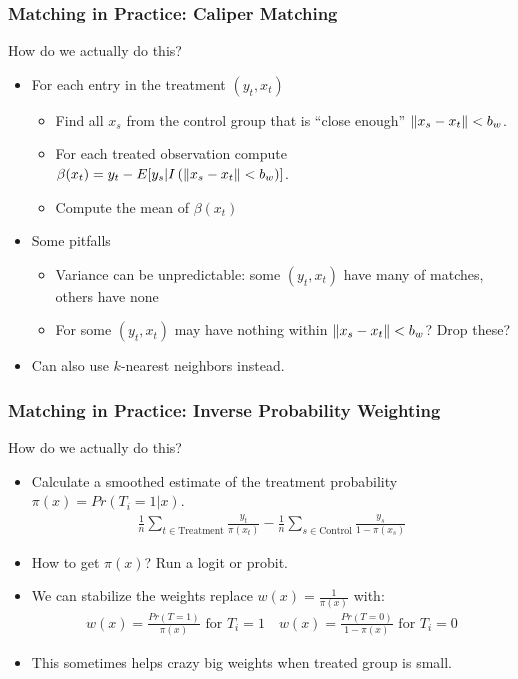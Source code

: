 \documentclass[xcolor=pdftex,dvipsnames,table,mathserif,aspectratio=169]{beamer}
\DeclarePairedDelimiter\norm{\lVert}{\rVert}%
\begin{document}
\begin{frame}
\frametitle{Matching in Practice: \alert{Caliper Matching}}
How do we actually do this?
\begin{itemize}
\item For each entry in the treatment $(y_t,x_t)$
\begin{itemize}
\item Find all $x_s$ from the control group that is ``close enough''  $\norm{x_s -x_t}<b_w$.
\item For each treated observation compute $\beta(x_t) = y_t - E[y_s |  I \left( \norm{x_s -x_t}<b_w\right)]$.
\item Compute the mean of $\beta(x_t)$
\end{itemize}
\item Some pitfalls
\begin{itemize}
\item Variance can be unpredictable: some $(y_t,x_t)$ have many of matches, others have none
\item For some $(y_t,x_t)$ may have nothing within $\norm{x_s -x_t}<b_w$? Drop these?
\end{itemize}
\item Can also use $k$-\alert{nearest neighbors} instead.
\end{itemize}
\end{frame}


\begin{frame}
\frametitle{Matching in Practice: \alert{Inverse Probability Weighting}}
How do we actually do this?
\begin{itemize}
\item Calculate a smoothed estimate of the treatment probability $\pi(x) = Pr(T_i =1 | x)$.
\begin{align*}
\frac{1}{n}\sum_{t \in \text{Treatment}} \frac{y_t}{\pi(x_t)} - \frac{1}{n} \sum_{s \in \text{Control}} \frac{y_s}{1-\pi(x_s)}
\end{align*}
\item How to get $\pi(x)$? Run a logit or probit.
\item We can stabilize the weights replace $w(x) =\frac{1}{\pi(x)}$ with:
\begin{align*}
w(x)=\frac{Pr(T=1)}{\pi(x)}  \mbox{ for } T_i=1 \quad
w(x)=\frac{Pr(T=0)}{1-\pi(x)} \mbox{ for } T_i=0
\end{align*}
\item This sometimes helps crazy big weights when treated group is small.
\end{itemize}
\end{frame}
\end{document}

